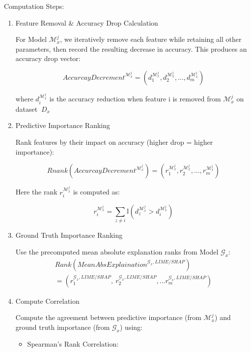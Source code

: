 \documentclass{article}
\begin{document}
Computation Steps:

\begin{enumerate}
    \item Feature Removal \& Accuracy Drop Calculation
    
    For Model $\mathcal{M}_{x}^{j}$, we iteratively remove each feature while retaining all other parameters, then record the resulting decrease in accuracy. This produces an accuracy drop vector:
    
    $${AccurcayDecrement}^{\mathcal{M}_{x}^{j}} = (d_{1}^{\mathcal{M}_{x}^{j}},d_{2}^{\mathcal{M}_{x}^{j}},\ldots,d_{m}^{\mathcal{M}_{x}^{j}})$$
    
    where $d_{i}^{\mathcal{M}_{x}^{j}}$ is the accuracy reduction when feature i is removed from $\mathcal{M}_{x}^{j}$ on dataset ${\ D}_{x}$
    
    \item Predictive Importance Ranking
    
    Rank features by their impact on accuracy (higher drop = higher importance):
    
    $$Rnank\left( {AccurcayDecrement}^{\mathcal{M}_{x}^{j}} \right) = (r_{1}^{\mathcal{M}_{x}^{j}},r_{2}^{\mathcal{M}_{x}^{j}},\ldots,r_{m}^{\mathcal{M}_{x}^{j}})$$
    
    Here the rank $r_{i}^{\mathcal{M}_{x}^{j}}$ is computed as:
    
    $$r_{i}^{\mathcal{M}_{x}^{j}} = \sum_{z \neq i}^{}\mathbb{I}(d_{z}^{\mathcal{M}_{x}^{j}} > d_{i}^{\mathcal{M}_{x}^{j}})$$
    
    \item Ground Truth Importance Ranking
    
    Use the precomputed mean absolute explanation ranks from Model $\mathcal{G}_{x}$:
\begin{align}
    Rank\left( {MeanAbsExplaination}^{\mathcal{G}_{x},LIME/SHAP} \right) \nonumber \\= (r_{1}^{\mathcal{G}_{x},LIME/SHAP},\ r_{2}^{\mathcal{G}_{x},LIME/SHAP},\ldots r_{m}^{\mathcal{G}_{x},LIME/SHAP})\nonumber
\end{align}
    
    
    \item Compute Correlation
    
    Compute the agreement between predictive importance (from $\mathcal{M}_{x}^{j}$) and ground truth importance (from $\mathcal{G}_{x}$) using:
    
    \begin{itemize}
        \item Spearman's Rank Correlation:


\end{itemize}
\end{enumerate}
\end{document}
